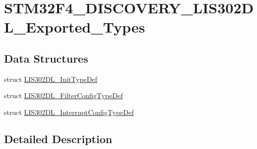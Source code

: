 \hypertarget{group___s_t_m32_f4___d_i_s_c_o_v_e_r_y___l_i_s302_d_l___exported___types}{\section{S\-T\-M32\-F4\-\_\-\-D\-I\-S\-C\-O\-V\-E\-R\-Y\-\_\-\-L\-I\-S302\-D\-L\-\_\-\-Exported\-\_\-\-Types}
\label{group___s_t_m32_f4___d_i_s_c_o_v_e_r_y___l_i_s302_d_l___exported___types}
}
\subsection*{Data Structures}
\begin{DoxyCompactItemize}
\item 
struct \hyperlink{struct_l_i_s302_d_l___init_type_def}{L\-I\-S302\-D\-L\-\_\-\-Init\-Type\-Def}
\item 
struct \hyperlink{struct_l_i_s302_d_l___filter_config_type_def}{L\-I\-S302\-D\-L\-\_\-\-Filter\-Config\-Type\-Def}
\item 
struct \hyperlink{struct_l_i_s302_d_l___interrupt_config_type_def}{L\-I\-S302\-D\-L\-\_\-\-Interrupt\-Config\-Type\-Def}
\end{DoxyCompactItemize}


\subsection{Detailed Description}
